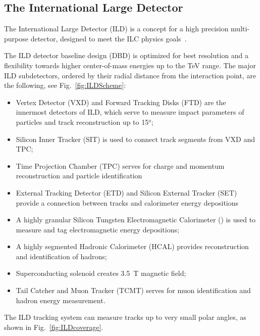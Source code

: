 
\subsection{The International Large Detector}


The International Large Detector (ILD) is a concept for a high precision multi-purpose detector, designed to meet the ILC physics goals~\cite{Behnke:2013lya}.

The ILD detector baseline design (DBD) is optimized for best resolution and a flexibility towards higher center-of-mass energies up to the TeV range.
The major ILD subdetectors, ordered by their radial distance from the interaction point, are the following, see Fig.~\ref{fig:ILDScheme}:
\begin{itemize}
\item Vertex Detector (VXD) and Forward Tracking Disks (FTD) are the innermost detectors of ILD, which serve to measure impact parameters of particles and track reconstruction up to 15$^o$;
\item Silicon Inner Tracker (SIT) is used to connect track segments from VXD and TPC;
\item Time Projection Chamber (TPC) serves for charge and momentum reconstruction and particle identification
\item External Tracking Detector (ETD) and Silicon External Tracker (SET) provide a connection between tracks and calorimeter energy depositions 
\item A highly granular Silicon Tungsten Electromagnetic Calorimeter (\ecal) is used to measure and tag electromagnetic energy depositions;
\item A highly segmented Hadronic Calorimeter (HCAL) provides reconstruction and identification of hadrons;
\item Superconducting solenoid creates 3.5~T magnetic field;
\item Tail Catcher and Muon Tracker (TCMT) serves for muon identification and hadron energy measurement.
\end{itemize}
The ILD tracking system can measure tracks up to very small polar angles, as shown in Fig.~\ref{fig:ILDcoverage}.


